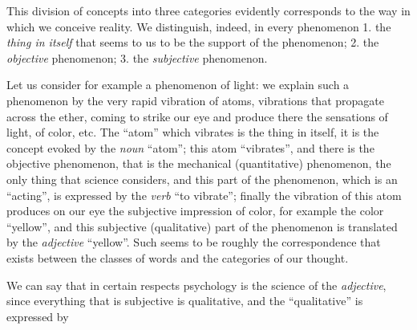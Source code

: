 {    This division of concepts into three categories evidently
    corresponds to the way in which we conceive reality. We
    distinguish, indeed, in every phenomenon 1. the \emph{thing in
      itself} that seems to us to be the support of the phenomenon;
    2. the \emph{objective} phenomenon; 3. the \emph{subjective}
    phenomenon.

    Let us consider for example a phenomenon of light: we explain such
    a phenomenon by the very rapid vibration of atoms, vibrations that
    propagate across the ether, coming to strike our eye and produce
    there the sensations of light, of color, etc. The ``atom'' which
    vibrates is the thing in itself, it is the concept evoked by the
    \emph{noun} ``atom''; this atom ``vibrates'', and there is the
    objective phenomenon, that is the mechanical (quantitative)
    phenomenon, the only thing that science considers, and this part
    of the phenomenon, which is an ``acting'', is expressed by the
    \emph{verb} ``to vibrate''; finally the vibration of this atom
    produces on our eye the subjective impression of color, for
    example the color ``yellow'', and this subjective (qualitative)
    part of the phenomenon is translated by the \emph{adjective}
    ``yellow''. Such seems to be roughly the correspondence that exists
    between the classes of words and the categories of our thought.

    We can say that in certain respects psychology is the science of
    the \emph{adjective}, since everything that is subjective is
    qualitative, and the ``qualitative'' is expressed by
    }

